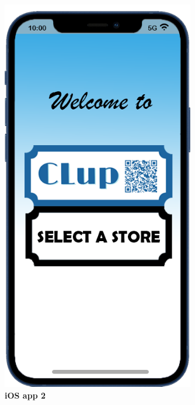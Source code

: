 \begin{figure}[!h]
\begin{minipage}{0.4\textwidth}
\includegraphics[width=0.75\textwidth]{Images/App/iPhone_HomeScreenv2}
\captionsetup{justification=centering}
\caption{\label{fig:ios2}\textbf{iOS app 2}}
\end{minipage}
\end{figure}

